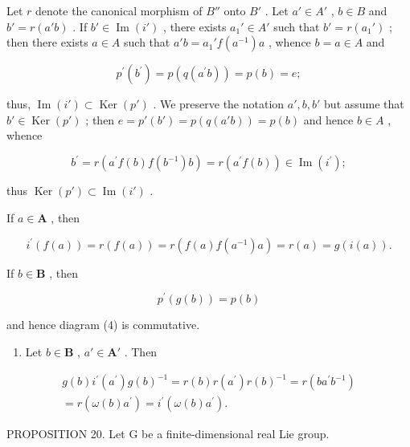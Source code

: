 Let \(r\) denote the canonical morphism of \(B''\) onto \(B'\) . Let \(a' \in A'\) , \(b \in B\) and \(b' = r(a'b)\) . If \(b' \in \operatorname{Im}(i')\) , there exists \(a_1' \in A'\) such that \(b' = r(a_1')\) ; then there exists \(a \in A\) such that \(a'b = a_1'f(a^{-1})a\) , whence \(b = a \in A\) and

\[
p ^ {\prime} (b ^ {\prime}) = p (q (a ^ {\prime} b)) = p (b) = e;
\]

thus, \(\operatorname{Im}(i') \subset \operatorname{Ker}(p')\) . We preserve the notation \(a', b, b'\) but assume that \(b' \in \operatorname{Ker}(p')\) ; then \(e = p'(b') = p(q(a'b)) = p(b)\) and hence \(b \in A\) , whence

\[
b ^ {\prime} = r (a ^ {\prime} f (b) f (b ^ {- 1}) b) = r (a ^ {\prime} f (b)) \in \operatorname{Im} (i ^ {\prime});
\]

thus \(\operatorname{Ker}(p') \subset \operatorname{Im}(i')\) .

If \(a\in \mathbf{A}\) , then

\[
i ^ {\prime} (f (a)) = r (f (a)) = r (f (a) f \left(a ^ {- 1}\right) a) = r (a) = g (i (a)).
\]

If \(b\in \mathbf{B}\) , then

\[
p ^ {\prime} (g (b)) = p (b)
\]

and hence diagram (4) is commutative.

\begin{enumerate}
\def\labelenumi{(\roman{enumi})}
\setcounter{enumi}{3}
\tightlist
\item
  Let \(b \in \mathbf{B}\) , \(a' \in \mathbf{A}'\) . Then
\end{enumerate}

\[
\begin{array}{r} g (b) i ^ {\prime} (a ^ {\prime}) g (b) ^ {- 1} = r (b) r (a ^ {\prime}) r (b) ^ {- 1} = r (b a ^ {\prime} b ^ {- 1}) \\ = r (\omega (b) a ^ {\prime}) = i ^ {\prime} (\omega (b) a ^ {\prime}). \end{array}
\]

PROPOSITION 20. Let G be a finite-dimensional real Lie group.

